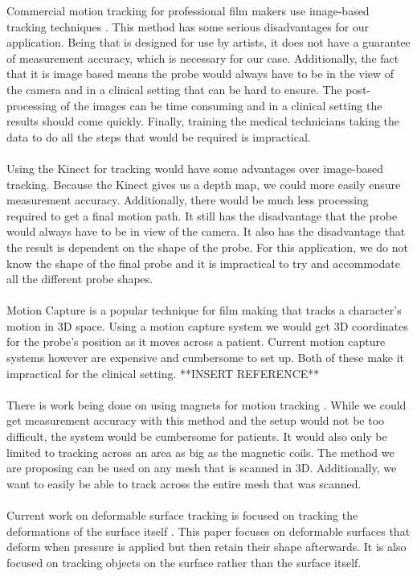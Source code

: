 \documentclass[11pt,psfig]{article}
\begin{document}
Commercial motion tracking for professional film makers use image-based tracking techniques \cite{trackingwebsite}. This method has some serious disadvantages for our application. Being that is designed for use by artists, it does not have a guarantee of measurement accuracy, which is necessary for our case. Additionally, the fact that it is image based means the probe would always have to be in the view of the camera and in a clinical setting that can be hard to ensure. The post-processing of the images can be time consuming and in a clinical setting the results should come quickly. Finally, training the medical technicians taking the data to do all the steps that would be required is impractical. \\
\\
Using the Kinect for tracking would have some advantages over image-based tracking. Because the Kinect gives us a depth map, we could more easily ensure measurement accuracy. Additionally, there would be much less processing required to get a final motion path. It still has the disadvantage that the probe would always have to be in view of the camera. It also has the disadvantage that the result is dependent on the shape of the probe. For this application, we do not know the shape of the final probe and it is impractical to try and accommodate all the different probe shapes.\\
\\
Motion Capture is a popular technique for film making that tracks a character's motion in 3D space. Using a motion capture system we would get 3D coordinates for the probe's position as it moves across a patient. Current motion capture systems however are expensive and cumbersome to set up. Both of these make it impractical for the clinical setting. **INSERT REFERENCE**\\
\\
There is work being done on using magnets for motion tracking \cite{magnetictracking}. While we could get measurement accuracy with this method and the setup would not be too difficult, the system would be cumbersome for patients. It would also only be limited to tracking across an area as big as the magnetic coils. The method we are proposing can be used on any mesh that is scanned in 3D. Additionally, we want to easily be able to track across the entire mesh that was scanned.\\
\\
Current work on deformable surface tracking is focused on tracking the deformations of the surface itself \cite{deformableobjecttracking,convexopt}. This paper focuses on deformable surfaces that deform when pressure is applied but then retain their shape afterwards. It is also focused on tracking objects on the surface rather than the surface itself.\\
\end{document}
